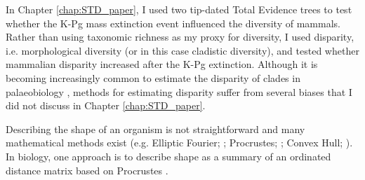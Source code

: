 In Chapter \ref{chap:STD_paper}, I used two tip-dated Total Evidence trees to test whether the K-Pg mass extinction event influenced the diversity of mammals.
Rather than using taxonomic richness as my proxy for diversity, I used disparity, i.e. morphological diversity (or in this case cladistic diversity), and tested whether mammalian disparity increased after the K-Pg extinction.
Although it is becoming increasingly common to estimate the disparity of clades in palaeobiology \citep[e.g.]{Butler2012,brusattedinosaur2012,toljagictriassic-jurassic2013,brusattegradual2014,bensonfaunal2014,Claddis,Close2015}, methods for estimating disparity suffer from several biases that I did not discuss in Chapter \ref{chap:STD_paper}.

Describing the shape of an organism is not straightforward and many mathematical methods exist (e.g. Elliptic Fourier; \citealt{Fourier1982}; Procrustes; \citealt{JamesRohlf1993129}; Convex Hull; \citealt{ANDREW1979216}). %
In biology, one approach is to describe shape as a summary of an ordinated distance matrix based on Procrustes %
 \citep[i.e. a geometric morphometric approach][]{zelditch2012geometric}.

